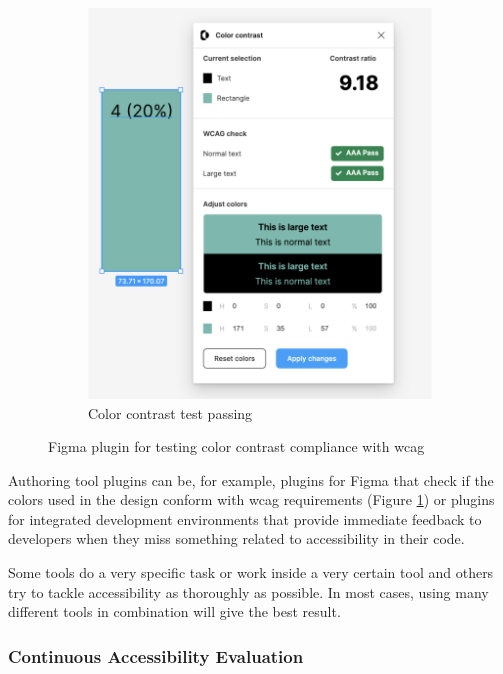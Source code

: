 \documentclass{master_thesis}
\begin{document}
\begin{figure}[ht]
\begin{subfigure}{0.4\textwidth}
		\includegraphics[width=\textwidth]{img/figma plugin-color-contrast-pass.png}
		\caption{Color contrast test passing}
	\end{subfigure}
\caption{Figma plugin for testing color contrast compliance with \ac{wcag}}
\label{fig:figma-plugin}
\end{figure}

Authoring tool plugins can be, for example, plugins for Figma that check if the colors used in the design conform with \ac{wcag} requirements (Figure \ref{fig:figma-plugin}) or plugins for integrated development environments that provide immediate feedback to developers when they miss something related to accessibility in their code.

Some tools do a very specific task or work inside a very certain tool and others try to tackle accessibility as thoroughly as possible. In most cases, using many different tools in combination will give the best result.

\subsubsection{Continuous Accessibility Evaluation} \label{continuous-a11y-evaluation}
\end{document}
